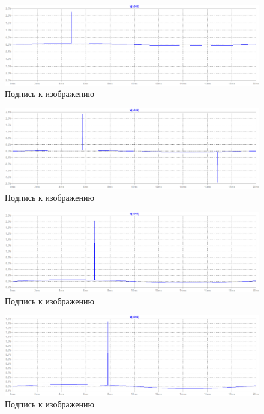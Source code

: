 \documentclass[a4paper, 12pt]{article}
\begin{document}
    \begin{figure}[H]
        \centering
        \includegraphics[scale=0.45]{R2-160k_L20m.png}
        \captionsetup{skip=0pt}
        \caption{Подпись к изображению}
        \label{fig:R2-160k_L20m}
    \end{figure}
    \begin{figure}[H]
        \centering
        \includegraphics[scale=0.45]{R2-210k_L20m.png}
        \captionsetup{skip=0pt}
        \caption{Подпись к изображению}
        \label{fig:R2-210k_L20m}
    \end{figure}
    \begin{figure}[H]
        \centering
        \includegraphics[scale=0.45]{R2-260k_L20m.png}
        \captionsetup{skip=0pt}
        \caption{Подпись к изображению}
        \label{fig:R2-260k_L20m}
    \end{figure}
    \begin{figure}[H]
        \centering
        \includegraphics[scale=0.45]{R2-300k_L20m.png}
        \captionsetup{skip=0pt}
        \caption{Подпись к изображению}
        \label{fig:R2-300k_L20m}
    \end{figure}
\end{document}
